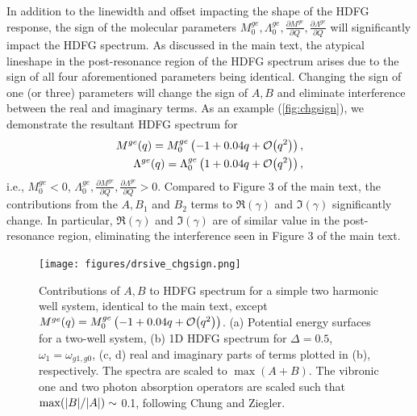 \documentclass[aip, jcp, reprint, onecolumn, nofootinbib]{revtex4-2}
\begin{document}
In addition to the linewidth and offset impacting the shape of the HDFG response, the sign of the molecular parameters $M^{ge}_0, \Lambda^{ge}_0, \frac{\partial M^{ge}}{\partial Q} , \frac{\partial \Lambda^{ge}}{\partial Q}$ will significantly impact the HDFG spectrum.
As discussed in the main text, the atypical lineshape in the post-resonance region of the HDFG spectrum arises due to the sign of all four aforementioned parameters being identical.
Changing the sign of one (or three) parameters will change the sign of $A, B$ and eliminate interference between the real and imaginary terms.  
As an example (\autoref{fig:chgsign}), we demonstrate the resultant HDFG spectrum for \begin{eqnarray}
	M^{ge}(q) = M^{ge}_0 \left(-1 + 0.04 q + \order{q^2}\right),  \\
	\Lambda^{ge}(q) = \Lambda^{ge}_0 \left(1 + 0.04 q + \order{q^2}\right),
\end{eqnarray}
i.e., $M^{ge}_0 < 0$, $\Lambda^{ge}_0, \frac{\partial M^{ge}}{\partial Q} , \frac{\partial \Lambda^{ge}}{\partial Q} > 0$.
Compared to Figure 3 of the main text, the contributions from the $A, B_1$ and $B_2$ terms to $\Re(\gamma)$ and $\Im(\gamma)$ significantly change.
In particular, $\Re(\gamma)$ and $\Im(\gamma)$ are of similar value in the post-resonance region, eliminating the interference seen in Figure 3 of the main text.
\newpage
\begin{figure}[!htbp]
	\centering
	\texttt{[image: figures/drsive\_chgsign.png]}
	\caption{Contributions of $A, B$ to HDFG spectrum for a simple two harmonic well system, identical to the main text, except $M^{ge}(q) = M^{ge}_0 \left(-1 + 0.04 q + \order{q^2}\right)$.
		(a) Potential energy surfaces for a two-well system, (b) 1D HDFG spectrum for $\Delta = 0.5$, $\omega_1 = \omega_{g1, g0}$, (c, d) real and imaginary parts of terms plotted in (b), respectively.
		The spectra are scaled to $\max{(A+B)}$. 
		The vibronic one and two photon absorption operators are scaled such that $\max(\abs{B}/\abs{A}) \sim$ 0.1, following Chung and Ziegler. \cite{Ziegler1988}
} 
	\label{fig:chgsign}
\end{figure}
\pagebreak
\end{document}
